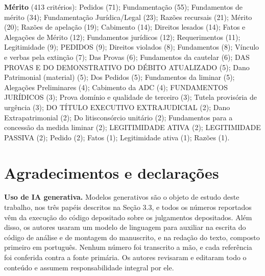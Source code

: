 \documentclass{IOS-Book-Article}
\begin{document}
\textbf{Mérito} (413 critérios): Pedidos (71); Fundamentação (55); Fundamentos de mérito (34); Fundamentação Jurídica/Legal (23); Razões recursais (21); Mérito (20); Razões de apelação (19); Cabimento (14); Direitos lesados (14); Fatos e Alegações de Mérito (12); Fundamentos jurídicos (12); Requerimentos (11); Legitimidade (9); PEDIDOS (9); Direitos violados (8); Fundamentos (8); Vínculo e verbas pela extinção (7); Das Provas (6); Fundamentos da cautelar (6); DAS PROVAS E DO DEMONSTRATIVO DO DÉBITO ATUALIZADO (5); Dano Patrimonial (material) (5); Dos Pedidos (5); Fundamentos da liminar (5); Alegações Preliminares (4); Cabimento da ADC (4); FUNDAMENTOS JURÍDICOS (3); Prova domínio e qualidade de terceiro (3); Tutela provisória de urgência (3); DO TÍTULO EXECUTIVO EXTRAJUDICIAL (2); Dano Extrapatrimonial (2); Do litisconsórcio unitário (2); Fundamentos para a concessão da medida liminar (2); LEGITIMIDADE ATIVA (2); LEGITIMIDADE PASSIVA (2); Pedido (2); Fatos (1); Legitimidade ativa (1); Razões (1).

\section*{Agradecimentos e declarações}

\textbf{Uso de IA generativa.} Modelos generativos são o objeto de estudo deste trabalho, nos três papéis descritos na Seção 3.3, e todos os números reportados vêm da execução do código depositado sobre os julgamentos depositados. Além disso, os autores usaram um modelo de linguagem para auxiliar na escrita do código de análise e de montagem do manuscrito, e na redação do texto, composto primeiro em português. Nenhum número foi transcrito a mão, e cada referência foi conferida contra a fonte primária. Os autores revisaram e editaram todo o conteúdo e assumem responsabilidade integral por ele.
\end{document}
